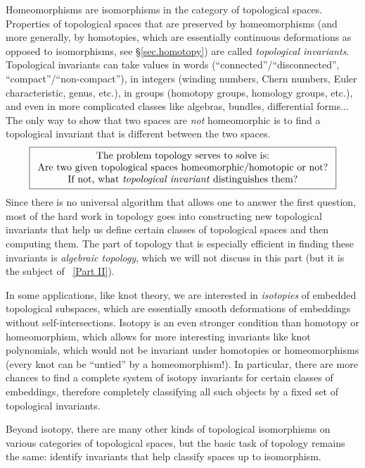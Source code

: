 Homeomorphisms are isomorphisms in the category of topological spaces. Properties of topological spaces that are preserved by homeomorphisms (and more generally, by homotopies, which are essentially continuous deformations as opposed to isomorphisms, see \S\ref{sec.homotopy}) are called \emph{topological invariants}. Topological invariants can take values in words (``connected''/``disconnected'', ``compact''/``non-compact''), in integers (winding numbers, Chern numbers, Euler characteristic, genus, etc.), in groups (homotopy groups, homology groups, etc.), and even in more complicated classes like algebras, bundles, differential forms... The only way to show that two spaces are \emph{not} homeomorphic is to find a topological invariant that is different between the two spaces.
\begin{gather*}
\boxed{\begin{array}{c}
\text{The problem topology serves to solve is:}\\
\text{Are two given topological spaces homeomorphic/homotopic or not?}\\
\text{If not, what \emph{topological invariant} distinguishes them?}
\end{array}}
\end{gather*}
Since there is no universal algorithm that allows one to answer the first question, most of the hard work in topology goes into constructing new topological invariants that help us define certain classes of topological spaces and then computing them. The part of topology that is especially efficient in finding these invariants is \emph{algebraic topology}, which we will not discuss in this part (but it is the subject of \Part~\ref{Part II}).

\begin{rem}
    In some applications, like knot theory, we are interested in \emph{isotopies} of embedded topological subspaces, which are essentially smooth deformations of embeddings without self-intersections. Isotopy is an even stronger condition than homotopy or homeomorphism, which allows for more interesting invariants like knot polynomials, which would not be invariant under homotopies or homeomorphisms (every knot can be ``untied'' by a homeomorphism!). In particular, there are more chances to find a complete system of isotopy invariants for certain classes of embeddings, therefore completely classifying all such objects by a fixed set of topological invariants. 
    
    Beyond isotopy, there are many other kinds of topological isomorphisms on various categories of topological spaces, but the basic task of topology remains the same: identify invariants that help classify spaces up to isomorphism.
\end{rem}


